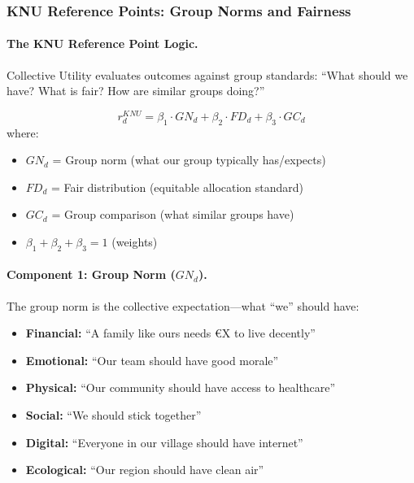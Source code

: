 \subsubsection{KNU Reference Points: Group Norms and Fairness}

\paragraph{The KNU Reference Point Logic.}
Collective Utility evaluates outcomes against group standards:
``What should we have? What is fair? How are similar groups doing?''

\begin{definition}
\label{def:knu-reference}
\begin{equation}
r^{KNU}_d = \beta_1 \cdot GN_d + \beta_2 \cdot FD_d + \beta_3 \cdot GC_d
\end{equation}
where:
\begin{itemize}
\item $GN_d$ = Group norm (what our group typically has/expects)
\item $FD_d$ = Fair distribution (equitable allocation standard)
\item $GC_d$ = Group comparison (what similar groups have)
\item $\beta_1 + \beta_2 + \beta_3 = 1$ (weights)
\end{itemize}
\end{definition}

\paragraph{Component 1: Group Norm ($GN_d$).}
The group norm is the collective expectation---what ``we'' should have:

\begin{itemize}
\item \textbf{Financial:} ``A family like ours needs \euro{X} to live decently''
\item \textbf{Emotional:} ``Our team should have good morale''
\item \textbf{Physical:} ``Our community should have access to healthcare''
\item \textbf{Social:} ``We should stick together''
\item \textbf{Digital:} ``Everyone in our village should have internet''
\item \textbf{Ecological:} ``Our region should have clean air''
\end{itemize}

